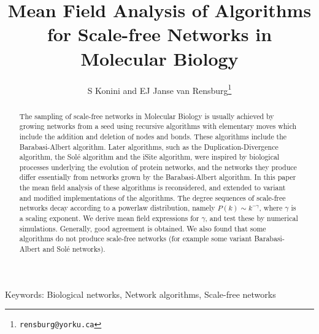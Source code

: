 \documentclass[12pt]{iopart}
\def\norf{\normalfont}
\begin{document}
\title{Mean Field Analysis of Algorithms for Scale-free Networks in Molecular Biology}
\author{S Konini and EJ Janse van Rensburg\footnote[1]{\texttt{rensburg@yorku.ca}}}
\address{\norf Department of Mathematics and Statistics, 
York University, Toronto, Ontario M3J~1P3, Canada\\}

\begin{abstract} %
\norf
The sampling of scale-free networks in Molecular Biology is usually achieved by
growing networks from a seed using recursive algorithms with elementary moves
which include the addition and deletion of nodes and bonds.  These algorithms
include the Barabasi-Albert algorithm.  Later algorithms, such as the
Duplication-Divergence algorithm, the Sol\'e algorithm and the iSite algorithm,
were inspired by biological processes underlying the evolution of protein networks,
and the networks they produce differ essentially from networks grown by the
Barabasi-Albert algorithm.  In this paper the mean field analysis of these algorithms
is reconsidered, and extended to variant and modified implementations of the
algorithms.  The degree sequences of scale-free networks decay according to
a powerlaw distribution, namely $P(k) \sim k^{-\gamma}$, where $\gamma$ is
a scaling exponent.  We derive mean field expressions for $\gamma$,
and test these by numerical simulations.   Generally, good agreement is obtained.
We also found that some algorithms do not produce scale-free networks
(for example some variant Barabasi-Albert and Sol\'e networks).
\end{abstract}


{\footnotesize
Keywords: Biological networks, Network algorithms, Scale-free networks}


\maketitle

\end{document}
